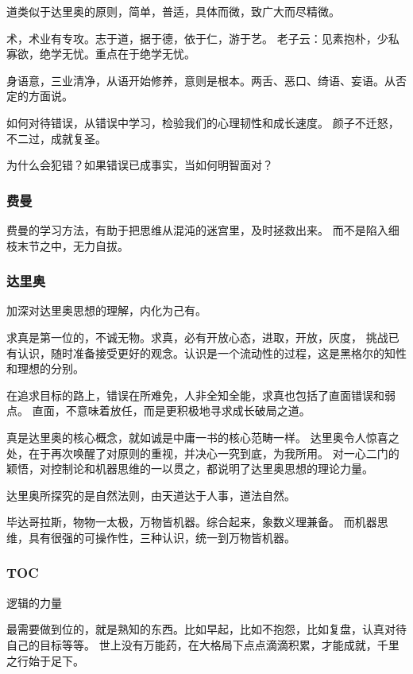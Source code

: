 道类似于达里奥的原则，简单，普适，具体而微，致广大而尽精微。

术，术业有专攻。志于道，据于德，依于仁，游于艺。
老子云：见素抱朴，少私寡欲，绝学无忧。重点在于绝学无忧。

身语意，三业清净，从语开始修养，意则是根本。两舌、恶口、绮语、妄语。从否定的方面说。

如何对待错误，从错误中学习，检验我们的心理韧性和成长速度。
颜子不迁怒，不二过，成就复圣。

为什么会犯错？如果错误已成事实，当如何明智面对？

\subsubsection{费曼}

费曼的学习方法，有助于把思维从混沌的迷宫里，及时拯救出来。
而不是陷入细枝末节之中，无力自拔。

\subsubsection{达里奥}

加深对达里奥思想的理解，内化为己有。

求真是第一位的，不诚无物。求真，必有开放心态，进取，开放，灰度，
挑战已有认识，随时准备接受更好的观念。认识是一个流动性的过程，这是黑格尔的知性和理想的分别。

在追求目标的路上，错误在所难免，人非全知全能，求真也包括了直面错误和弱点。
直面，不意味着放任，而是更积极地寻求成长破局之道。

真是达里奥的核心概念，就如诚是中庸一书的核心范畴一样。
达里奥令人惊喜之处，在于再次唤醒了对原则的重视，并决心一究到底，为我所用。
对一心二门的颖悟，对控制论和机器思维的一以贯之，都说明了达里奥思想的理论力量。

达里奥所探究的是自然法则，由天道达于人事，道法自然。

毕达哥拉斯，物物一太极，万物皆机器。综合起来，象数义理兼备。
而机器思维，具有很强的可操作性，三种认识，统一到万物皆机器。

\subsubsection{TOC}

逻辑的力量

最需要做到位的，就是熟知的东西。比如早起，比如不抱怨，比如复盘，认真对待自己的目标等等。
世上没有万能药，在大格局下点点滴滴积累，才能成就，千里之行始于足下。

